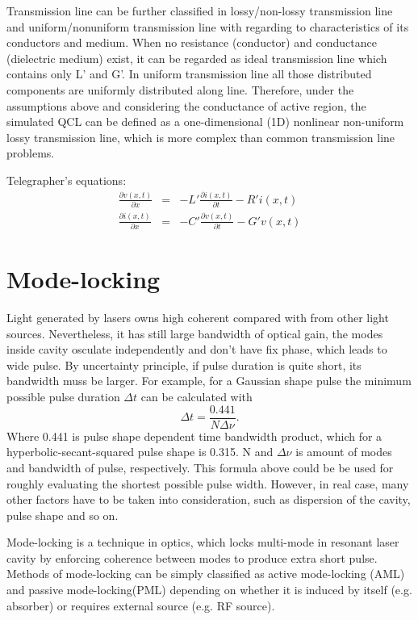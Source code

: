 \documentclass[11pt,final]{scrbook}
\begin{document}
Transmission line can be further classified in lossy/non-lossy transmission line and uniform/nonuniform transmission line with regarding to characteristics of its conductors and medium. When no resistance (conductor) and conductance (dielectric medium) exist, it can be regarded as ideal transmission line which contains only L' and G'. In uniform transmission line all those distributed components are uniformly distributed along line. Therefore, under the assumptions above and considering the conductance of active region, the simulated QCL can be defined as a one-dimensional (1D) nonlinear non-uniform lossy transmission line, which is more complex than common transmission line problems.

Telegrapher's equations:
\begin{eqnarray}
\frac { \partial v(x,t) }{ \partial x }  &=& -L'\frac { \partial i(x,t) }{ \partial t }-R'i(x,t) \label{eq:TLequation1}\\
\frac { \partial i(x,t) }{ \partial x }  &=& - C'\frac { \partial v(x,t) }{ \partial t }-G'v(x,t) \label{eq:TLequation2}
\end{eqnarray}

\section{Mode-locking}
Light generated by lasers owns high coherent compared with from other light sources. Nevertheless, it has still large bandwidth of optical gain, the modes inside cavity osculate independently and don't have fix phase, which leads to wide pulse. By uncertainty principle, if pulse duration is quite short, its bandwidth muss be larger. For example, for a Gaussian shape pulse the minimum possible pulse duration $\Delta t$ can be calculated with
\begin{equation}
\Delta t=\frac{0.441}{N\Delta \nu}.
\end{equation}
Where 0.441 is pulse shape dependent time bandwidth product, which for a hyperbolic-secant-squared pulse shape is 0.315. N and $\Delta \nu$ is amount of modes and bandwidth of pulse, respectively. This formula above could be be used for roughly evaluating the shortest possible pulse width. However, in real case, many other factors have to be taken into consideration, such as dispersion of the cavity, pulse shape and so on.

Mode-locking is a technique in optics, which locks multi-mode in resonant laser cavity by enforcing coherence between modes to produce extra short pulse\cite{haus2000mode}. Methods of mode-locking can be simply classified as active mode-locking (AML) and passive mode-locking(PML) depending on whether it is induced by itself (e.g. absorber) or requires external source (e.g. RF source).
\end{document}
